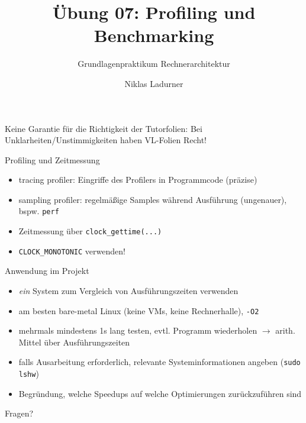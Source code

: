 \documentclass[
  german,            %
  aspectratio=169,    %
]{tumbeamer}
\title{Übung 07: Profiling und Benchmarking}
\subtitle{Grundlagenpraktikum Rechnerarchitektur}
\author{Niklas Ladurner}
\institute{\theChairName\\\theDepartmentName\\\theUniversityName}
\date{\DTMdisplaydate{2024}{5}{31}{-1}}
\begin{document}
\maketitle

\begin{frame}[c]{}{}
  \begin{center}
    \LARGE  Keine Garantie für die Richtigkeit der Tutorfolien: Bei Unklarheiten/Unstimmigkeiten
    haben VL-Folien Recht!
  \end{center}
\end{frame}

\begin{frame}[c, fragile]{Profiling und Zeitmessung}{}
  \begin{itemize}
    \item tracing profiler: Eingriffe des Profilers in Programmcode (präzise)
    \item sampling profiler: regelmäßige Samples während Ausführung (ungenauer), bspw. \verb|perf|
    \item Zeitmessung über \verb|clock_gettime(...)|
    \item \verb|CLOCK_MONOTONIC| verwenden!
  \end{itemize}
\end{frame}


\begin{frame}[c, fragile]{Anwendung im Projekt}{}
  \begin{itemize}
    \item \textit{ein} System zum Vergleich von Ausführungszeiten verwenden
    \item am besten bare-metal Linux (keine VMs, keine Rechnerhalle), \verb|-O2|
    \item mehrmals mindestens 1s lang testen, evtl. Programm wiederholen $\rightarrow$ arith. Mittel über Ausführungszeiten
    \item falls Ausarbeitung erforderlich, relevante Systeminformationen angeben (\verb|sudo lshw|)
    \item Begründung, welche Speedups auf welche Optimierungen zurückzuführen sind
  \end{itemize}
\end{frame}

\begin{frame}[c]{}{}
  \begin{center}
    \LARGE Fragen?
  \end{center}
\end{frame}
\end{document}
